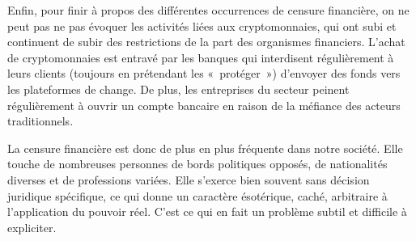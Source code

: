 Enfin, pour finir à propos des différentes occurrences de censure financière, on ne peut pas ne pas évoquer les activités liées aux cryptomonnaies, qui ont subi et continuent de subir des restrictions de la part des organismes financiers. L'achat de cryptomonnaies est entravé par les banques qui interdisent régulièrement à leurs clients (toujours en prétendant les «~protéger~») d'envoyer des fonds vers les plateformes de change. De plus, les entreprises du secteur peinent régulièrement à ouvrir un compte bancaire en raison de la méfiance des acteurs traditionnels.

La censure financière est donc de plus en plus fréquente dans notre société. Elle touche de nombreuses personnes de bords politiques opposés, de nationalités diverses et de professions variées. Elle s'exerce bien souvent sans décision juridique spécifique, ce qui donne un caractère ésotérique, caché, arbitraire à l'application du pouvoir réel. C'est ce qui en fait un problème subtil et difficile à expliciter.


